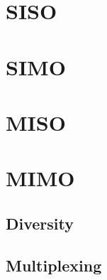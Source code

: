 \section{SISO}

\section{SIMO}

\section{MISO}

\section{MIMO}


\subsection{Diversity}
\label{subsection:MIMO-Diversity}

\subsection{Multiplexing}
\label{subsection:MIMO-Multiplexing}
